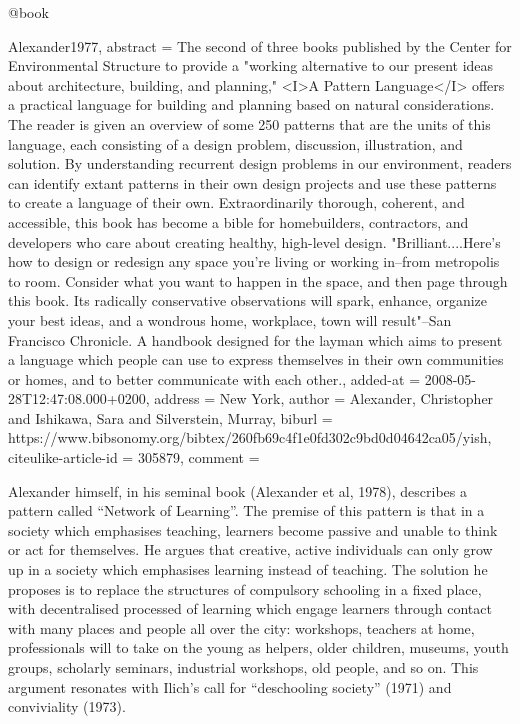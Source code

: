 @book{Alexander1977,
  abstract = {The second of three books published by the Center for Environmental Structure to provide a "working alternative to our present ideas about architecture, building, and planning," <I>A Pattern Language</I> offers a practical language for building and planning based on natural considerations. The reader is given an overview of some 250 patterns that are the units of this language, each consisting of a design problem, discussion, illustration, and solution. By understanding recurrent design problems in our environment, readers can identify extant patterns in their own design projects and use these patterns to create a language of their own. Extraordinarily thorough, coherent, and accessible, this book has become a bible for homebuilders, contractors, and developers who care about creating healthy, high-level design. "Brilliant....Here's how to design or redesign any space you're living or working in--from metropolis to room. Consider what you want to happen in the space, and then page through this book. Its radically conservative observations will spark, enhance, organize your best ideas, and a wondrous home, workplace, town will result"--San Francisco Chronicle. A handbook designed for the layman which aims to present a language which people can use to express themselves in their own communities or homes, and to better communicate with each other.},
  added-at = {2008-05-28T12:47:08.000+0200},
  address = {New York},
  author = {Alexander, Christopher and Ishikawa, Sara and Silverstein, Murray},
  biburl = {https://www.bibsonomy.org/bibtex/260fb69c4f1e0fd302c9bd0d04642ca05/yish},
  citeulike-article-id = {305879},
  comment = {Alexander himself, in his seminal book (Alexander et al, 1978), describes a pattern called “Network of Learning”. The premise of this pattern is that in a society which emphasises teaching, learners become passive and unable to think or act for themselves. He argues that creative, active individuals can only grow up in a society which emphasises learning instead of teaching. The solution he proposes is to replace the structures of compulsory schooling in a fixed place, with decentralised processed of learning which engage learners through contact with many places and people all over the city: workshops, teachers at home, professionals will to take on the young as helpers, older children, museums, youth groups, scholarly seminars, industrial workshops, old people, and so on. This argument resonates with Ilich's call for “deschooling society” (1971) and conviviality (1973).

}}
